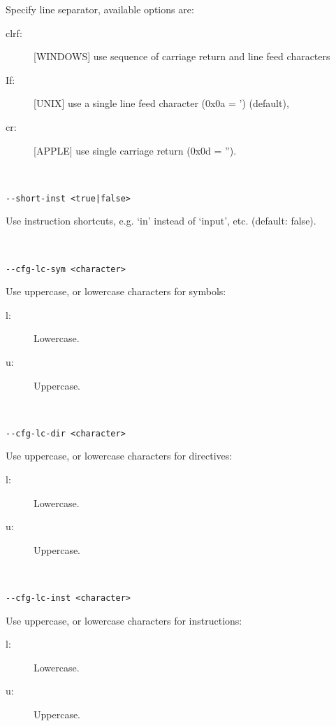                 Specify line separator, available options are:
                \begin{description}
                  \item [clrf:] [WINDOWS] use sequence of carriage return and line feed characters
                  \item [If:] [UNIX] use a single line feed character (0x0a = ') (default),
                  \item [cr:] [APPLE] use single carriage return (0x0d = '').
                \end{description}
                {
                ~\\
                \usecodefont

                \verb'--short-inst <true|false>'\\
                }
                Use instruction shortcuts, e.g. `in' instead of `input', etc. (default: false).
                {
                ~\\
                \usecodefont

                \verb'--cfg-lc-sym <character>'\\
                }
                Use uppercase, or lowercase characters for symbols:
                \begin{description}
                    \item [l:] Lowercase.
                    \item [u:] Uppercase.
                \end{description}
                {
                ~\\
                \usecodefont

                \verb'--cfg-lc-dir <character>'\\
                }
                Use uppercase, or lowercase characters for directives:
                \begin{description}
                    \item [l:] Lowercase.
                    \item [u:] Uppercase.
                \end{description}
                {
                ~\\
                \usecodefont

                \verb'--cfg-lc-inst <character>'\\
                }
                Use uppercase, or lowercase characters for instructions:
                \begin{description}
                    \item [l:] Lowercase.
                    \item [u:] Uppercase.
                \end{description}
